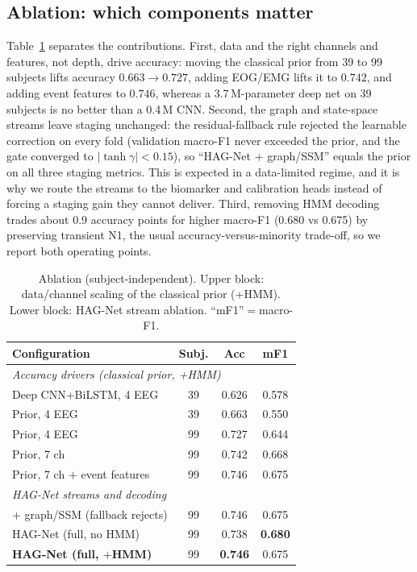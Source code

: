 \documentclass[journal]{IEEEtran}
\newcommand{\hagAccR}{0.738}   %
\newcommand{\hagMfR}{0.680}    %
\newcommand{\hagAccH}{0.746}   %
\newcommand{\hagMfH}{0.675}    %
\begin{document}
\subsection{Ablation: which components matter}
\label{sec:ablation}
Table~\ref{tab:ablation} separates the contributions. First, data and the right
channels and features, not depth, drive accuracy: moving the classical prior from
39 to 99 subjects lifts accuracy $0.663\!\rightarrow\!0.727$, adding EOG/EMG lifts
it to $0.742$, and adding event features to $0.746$, whereas a 3.7\,M-parameter
deep net on 39 subjects is no better than a 0.4\,M CNN. Second, the graph and
state-space streams leave staging unchanged: the residual-fallback rule rejected
the learnable correction on every fold (validation macro-F1 never exceeded the
prior, and the gate converged to $|\tanh\gamma|<0.15$), so ``HAG-Net + graph/SSM''
equals the prior on all three staging metrics. This is expected in a data-limited
regime, and it is why we route the streams to the biomarker and calibration heads
instead of forcing a staging gain they cannot deliver. Third, removing HMM decoding
trades about 0.9 accuracy points for higher macro-F1 (0.680 vs 0.675) by preserving
transient N1, the usual accuracy-versus-minority trade-off, so we report both
operating points.

\begin{table}[t]
\caption{Ablation (subject-independent). Upper block: data/channel scaling of the
classical prior (+HMM). Lower block: HAG-Net stream ablation. ``mF1''$=$macro-F1.}
\label{tab:ablation}
\centering
\setlength{\tabcolsep}{4pt}
\begin{tabular}{lccc}
\toprule
Configuration & Subj. & Acc & mF1 \\
\midrule
\multicolumn{4}{l}{\emph{Accuracy drivers (classical prior, +HMM)}}\\
Deep CNN+BiLSTM, 4 EEG           & 39 & 0.626 & 0.578 \\
Prior, 4 EEG                     & 39 & 0.663 & 0.550 \\
Prior, 4 EEG                     & 99 & 0.727 & 0.644 \\
Prior, 7 ch                      & 99 & 0.742 & 0.668 \\
Prior, 7 ch $+$ event features   & 99 & 0.746 & 0.675 \\
\midrule
\multicolumn{4}{l}{\emph{HAG-Net streams and decoding}}\\
$+$ graph/SSM (fallback rejects) & 99 & 0.746 & 0.675 \\
HAG-Net (full, no HMM)           & 99 & \hagAccR & \textbf{\hagMfR} \\
\textbf{HAG-Net (full, $+$HMM)}  & 99 & \textbf{\hagAccH} & \hagMfH \\
\bottomrule
\end{tabular}
\end{table}
\end{document}

